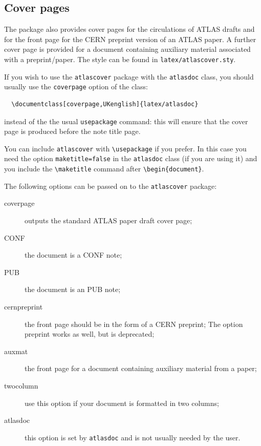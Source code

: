 \documentclass[UKenglish]{latex/atlasdoc}
\newcommand{\Macro}[1]{\texttt{\textbackslash #1}\xspace}
\newcommand{\Option}[1]{\textsf{#1}\xspace}
\newcommand{\Package}[1]{\texttt{#1}\xspace}
\begin{document}
\subsection{Cover pages}
\label{sec:cover}

The package also provides cover pages for the circulations of ATLAS drafts and 
for the front page for the CERN preprint version of an ATLAS paper.
A further cover page is provided for a document containing auxiliary material associated with a preprint/paper.
The style can be found in \texttt{latex/atlascover.sty}.

If you wish to use the \texttt{atlascover} package with the 
\texttt{atlasdoc} class, you should usually use the \texttt{coverpage} option of the class:
\begin{verbatim}
  \documentclass[coverpage,UKenglish]{latex/atlasdoc}
\end{verbatim}
instead of the the usual \texttt{usepackage} command: this will ensure
that the cover page is produced before the note title page.

You can include \texttt{atlascover} with \Macro{usepackage} if you prefer.
In this case you need the option \texttt{maketitle=false} in the \texttt{atlasdoc} class
(if you are using it)
and you include the \Macro{maketitle} command after \verb|\begin{document}|.

The following options can be passed on to the \Package{atlascover} package:
\begin{description}
\item[\Option{coverpage}] outputs the standard ATLAS paper draft cover page;
\item[\Option{CONF}] the document is a CONF note;
\item[\Option{PUB}] the document is an PUB note;
\item[\Option{cernpreprint}] the front page should be in the form of a CERN preprint;
  The option \Option{preprint} works as well, but is deprecated;
\item[\Option{auxmat}] the front page for a document containing auxiliary material from a paper;
\item[\Option{twocolumn}] use this option if your document is formatted in two columns;
\item[\Option{atlasdoc}] this option is set by \Package{atlasdoc} and is not usually needed by the user.
\end{description}
\end{document}

